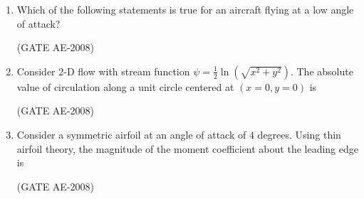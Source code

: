\documentclass[journal,12pt,onecolumn]{IEEEtran}
\theoremstyle{remark}
\begin{document}
\begin{enumerate}
\item Which of the following statements is true for an aircraft flying at a low angle of attack?  
\begin{enumerate}
\end{enumerate}
    \hfill(GATE AE-2008)

    \quad

\item Consider 2-D flow with stream function $\psi = \frac{1}{2} \ln\left( \sqrt{x^2 + y^2} \right)$. The absolute value of circulation along a unit circle centered at $(x=0, y=0)$ is  
\begin{enumerate}
\end{enumerate}
    \hfill(GATE AE-2008)

    \quad

\item Consider a symmetric airfoil at an angle of attack of $4$ degrees. Using thin airfoil theory, the magnitude of the moment coefficient about the leading edge is  
\begin{enumerate}
\end{enumerate}
    \hfill(GATE AE-2008)

    \quad


\end{enumerate}
\end{document}
